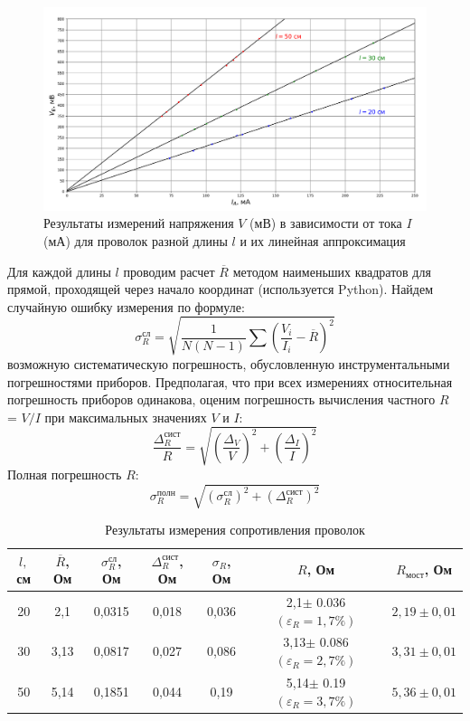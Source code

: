 \documentclass[a4paper,12pt]{article} %
\begin{document}
\begin{figure}[h!]
\centering
\includegraphics[width=\textwidth]{imgs/вах.png}
\caption{Результаты измерений напряжения $V$ (мВ) в зависимости от тока $I$ (мА) для проволок разной длины $l$ и их линейная аппроксимация } 
\label{графики}
\end{figure}

Для каждой длины $ l $ проводим расчет $\overline{R}$ методом наименьших квадратов для прямой, проходящей через начало координат (используется Python). Найдем случайную ошибку измерения по формуле:
\begin{equation}
\sigma_{R}^{\text{сл}} = \sqrt{\frac{1}{N(N-1)}\sum \left( \frac{V_i}{I_i}-\overline{R} \right)^2}
\end{equation}
 возможную систематическую погрешность, обусловленную инструментальными 
погрешностями приборов. Предполагая, что при всех измерениях относительная погрешность 
приборов одинакова, оценим погрешность вычисления частного $R$ = $V/I$ при максимальных 
значениях $V$ и $I$:
\begin{equation}
\frac{\Delta_{R}^{\text{сист}}}{R}=\sqrt{\left( \frac{\Delta_V}{V} \right)^2+\left( \frac{\Delta_I}{I} \right)^2}
\end{equation}
Полная погрешность $R$:
\begin{equation}
    \sigma_{{R}}^\text{полн} = \sqrt{(\sigma_{R}^\text{сл})^2+(\Delta_R^{\text{сист}})^2}
\end{equation}

\begin{table}[h]
\centering
\caption{Результаты измерения сопротивления проволок}
\begin{tabular}{|c|c|c|c|c|c|c|}
\hline 
$l, $см & $\overline{R}$, Ом & $\sigma_{R}^{\text{сл}}$, Ом & $\Delta_{R}^{\text{сист}}$, Ом & $\sigma_{R}$, Ом & $R$, Ом & $R_\text{мост}$, Ом\\ 
\hline 
20 & 2,1 & 0,0315 & 0,018 & 0,036 & 2,1$\pm$ 0.036 $(\varepsilon_R = 1,7\%)$& $2,19 \pm 0,01$\\ 
\hline 
30 & 3,13 & 0,0817 & 0,027 & 0,086 & 3,13$\pm$  0.086 $(\varepsilon_R = 2,7\%)$ & $3,31 \pm 0,01$\\ 
\hline 
50 & 5,14 & 0,1851 & 0,044 & 0,19 & 5,14$\pm$ 0.19 $(\varepsilon_R = 3,7\%)$ & $5,36 \pm 0,01$\\ 
\hline 
\end{tabular} 
\label{сопротив}
\end{table} 
\end{document}
